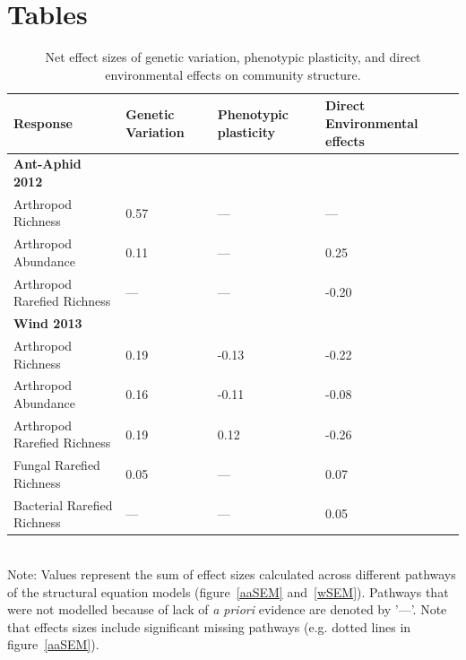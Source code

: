 \documentclass[11pt]{article}
\begin{document}

\newpage{}

\section*{Tables}
\renewcommand{\thetable}{\arabic{table}}
\setcounter{table}{0}


\begin{table}
\caption{Net effect sizes of genetic variation, phenotypic plasticity, and direct environmental effects on community structure.}
\label{tab:SEM}
\centering
\begin{tabular}{@{}llll@{}}
\toprule
Response & Genetic Variation & Phenotypic plasticity & Direct Environmental effects \\ 
\midrule
\textbf{Ant-Aphid 2012} & & & \\
Arthropod Richness  & 0.57 & --- & --- \\
Arthropod Abundance & 0.11 & --- & 0.25 \\
Arthropod Rarefied Richness & ---  & --- & -0.20 \\
\textbf{Wind 2013} & & & \\
 Arthropod Richness & 0.19 & -0.13 & -0.22 \\
Arthropod Abundance & 0.16 & -0.11 & -0.08 \\
Arthropod Rarefied Richness & 0.19 & 0.12 & -0.26 \\
Fungal Rarefied Richness & 0.05 & --- & 0.07 \\
Bacterial Rarefied Richness & --- & --- & 0.05 \\
\bottomrule
\end{tabular}
\bigskip{}
\\
{\footnotesize Note: Values represent the sum of effect sizes calculated across different pathways of the structural equation models (figure~\ref{aaSEM} and~\ref{wSEM}). Pathways that were not modelled because of lack of \textit{a priori} evidence are denoted by '---'. Note that effects sizes include significant missing pathways (e.g. dotted lines in figure~\ref{aaSEM}).}
\end{table}
\end{document}
